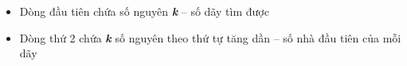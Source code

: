 \begin{itemize}
	\item Dòng đầu tiên chứa số nguyên \textbf{\emph{ k }} – số dãy tìm được
	\item Dòng thứ 2 chứa \textbf{\emph{ k }} số nguyên theo thứ tự tăng dần – số nhà đầu tiên của mỗi dãy
\end{itemize}